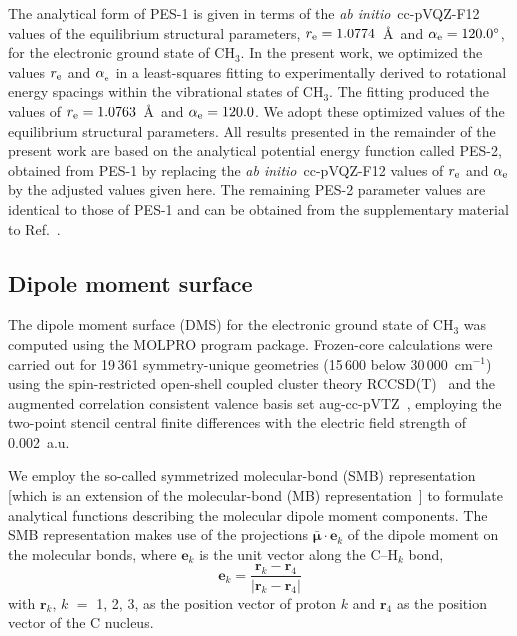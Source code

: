\documentclass{achemso}
\newcommand{\3}{$_{3}$}
\newcommand{\cm}{cm$^{-1}$}
\newcommand{\abinitio}{\textit{ab initio}}
\begin{document}
The analytical form of PES-1\cite{aa15}
is given in terms of
 the \abinitio\ cc-pVQZ-F12 values of the
equilibrium structural parameters,
$r_{\rm e} = 1.0774$~\AA\ and $\alpha_{\rm e}=
120.0^\circ$,\cite{aa15}
for the electronic ground state of CH\3. In the present work, we optimized
the values
 $r_{\rm e}$ and $\alpha_{\rm_e}$ in a least-squares fitting to experimentally derived
to rotational energy spacings within
 the vibrational states of CH\3.
The fitting produced the values of
$r_{\rm e} = 1.0763$~\AA\  and
$\alpha_{\rm e} = 120.0 $.
We adopt these optimized values of the equilibrium structural parameters.
All results presented in the remainder of the present work are based on
the analytical potential energy function called PES-2, obtained from PES-1\cite{aa15}
by replacing the
 \abinitio\ cc-pVQZ-F12 values of
$r_{\rm e}$ and $\alpha_{\rm e}$ by
the adjusted values given here. The remaining PES-2 parameter values are identical to
those of PES-1 and can be obtained from
the supplementary material to Ref.~.

\subsection{Dipole moment surface}\label{sec:DMS}

The dipole moment surface (DMS) for the electronic ground state of CH$_3$ was computed using the
MOLPRO\cite{molpro12}  program package. Frozen-core calculations were carried out for 19\,361
symmetry-unique geometries (15\,600 below 30\,000~\cm) using the spin-restricted open-shell coupled
cluster theory RCCSD(T)~\cite{watts} and the augmented correlation consistent valence basis set
aug-cc-pVTZ~\cite{dunning,kendall}, employing the two-point stencil central
finite differences with the electric field strength of 0.002~a.u.


We employ the so-called symmetrized molecular-bond (SMB) representation\cite{nh3_09}
[which is an extension of the
 molecular-bond (MB)
representation~\cite{nh3_05}]
to formulate analytical functions describing the molecular dipole moment
components.
The SMB representation makes use of
the projections
 $ \bar{\bm{\mu}} \cdot \mathbf{e}_k $
of the dipole moment on the molecular
bonds, where
  $\mathbf{e}_k$ is  the unit vector along the
C--H$_k$ bond,
\begin{equation}\label{e:e:r}
   \mathbf{e}_k = \frac{\mathbf{r}_k-\mathbf{r}_4}{|\mathbf{r}_k-\mathbf{r}_4|}
\end{equation}
with $\mathbf{r}_k$, $k$ $=$ 1, 2, 3, as the position vector of proton $k$ and
$\mathbf{r}_4$ as the position vector of the C nucleus.
\end{document}
